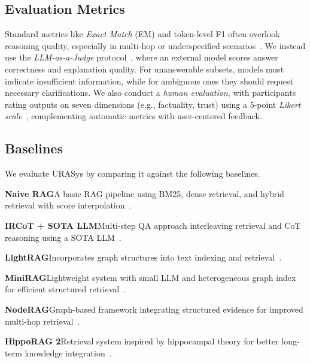 \documentclass[11pt]{article}
\begin{document}
\subsection{Evaluation Metrics}
\label{sec:metrics}



Standard metrics like \textit{Exact Match} (EM) and token-level F1 often overlook reasoning quality, especially in multi-hop or underspecified scenarios~\cite{schuff-etal-2020-f1}. We instead use the \textit{LLM-as-a-Judge} protocol~\cite{gu2024survey}, where an external model scores answer correctness and explanation quality. For unanswerable subsets, models must indicate insufficient information, while for ambiguous ones they should request necessary clarifications. We also conduct a \textit{human evaluation}, with participants rating outputs on seven dimensions (e.g., factuality, trust) using a 5-point \textit{Likert scale}~\cite{82e6db25-3f58-3cc9-99b4-104abc75f49e}, complementing automatic metrics with user-centered feedback.


\subsection{Baselines}
\label{sec:baselines}

We evaluate URASys by comparing it against the following baselines.

\smallskip \noindent
\textbf{Naive RAG}\quad A basic RAG pipeline using BM25, dense retrieval, and hybrid retrieval with score interpolation~\cite{10.1145/3637528.3671470}.

\smallskip \noindent
\textbf{IRCoT + SOTA LLM}\quad Multi-step QA approach interleaving retrieval and CoT reasoning using a SOTA LLM~\cite{trivedi-etal-2023-interleaving}.

\smallskip \noindent
\textbf{LightRAG}\quad Incorporates graph structures into text indexing and retrieval~\cite{guo2024lightrag}.

\smallskip \noindent
\textbf{MiniRAG}\quad Lightweight system with small LLM and heterogeneous graph index for efficient structured retrieval~\cite{fan2025minirag}.

\smallskip \noindent
\textbf{NodeRAG}\quad Graph-based framework integrating structured evidence for improved multi-hop retrieval~\cite{xu2025noderag}.

\smallskip \noindent
\textbf{HippoRAG 2}\quad Retrieval system inspired by hippocampal theory for better long-term knowledge integration~\cite{gutierrez2025rag}.
\end{document}
